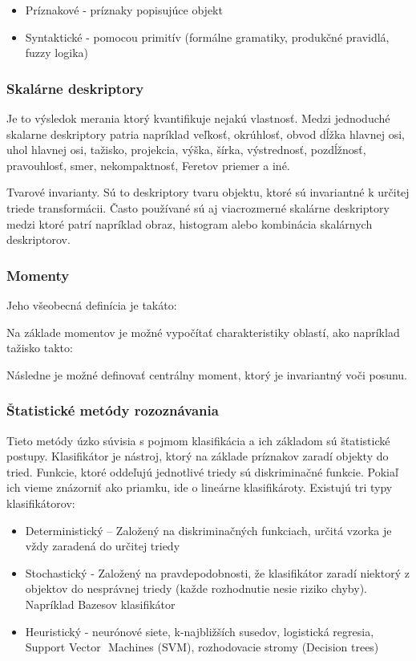 \begin{itemize}
\item Príznakové - príznaky popisujúce objekt 
\item Syntaktické - pomocou primitív (formálne gramatiky, produkčné pravidlá, fuzzy logika)
\end{itemize}

\subsubsection{Skalárne deskriptory}
Je to výsledok merania ktorý kvantifikuje nejakú vlastnosť. Medzi jednoduché skalarne deskriptory  patria napríklad veľkosť,  okrúhlosť, obvod dĺžka hlavnej osi, uhol hlavnej osi, tažisko,  projekcia, výška, šírka, výstrednosť, pozdĺžnosť, pravouhlosť, smer, nekompaktnosť, Feretov priemer a iné. 

Tvarové invarianty. Sú to deskriptory tvaru objektu, ktoré sú invariantné k určitej triede transformácii.
Často používané sú aj viacrozmerné skalárne deskriptory medzi ktoré patrí napríklad obraz, histogram alebo kombinácia skalárnych deskriptorov.

\subsubsection{Momenty}

Jeho všeobecná definícia je takáto:

Na základe momentov je možné vypočítať charakteristiky oblastí, ako napríklad tažisko takto: 


Následne je možné definovať centrálny moment, ktorý je invariantný voči posunu. 


\subsubsection{Štatistické metódy rozoznávania}
Tieto metódy úzko súvisia s pojmom klasifikácia a ich základom sú štatistické postupy. Klasifikátor je nástroj, ktorý na základe príznakov zaradí objekty do tried. Funkcie, ktoré oddeľujú jednotlivé triedy sú diskriminačné funkcie. Pokiaľ ich vieme znázorniť ako priamku, ide o lineárne klasifikároty. Existujú tri typy klasifikátorov: 

\begin{itemize}
\item Deterministický  – Založený na diskriminačných funkciach, určitá vzorka je vždy zaradená do určitej triedy 
\item Stochastický -  Založený na pravdepodobnosti, že klasifikátor zaradí niektorý z objektov do nesprávnej triedy (každe rozhodnutie nesie riziko chyby).  Napríklad Bazesov klasifikátor
\item Heuristický - neurónové siete, k-najbližších susedov, logistická regresia, Support Vector  Machines (SVM), rozhodovacie stromy (Decision trees) 
\end{itemize}

